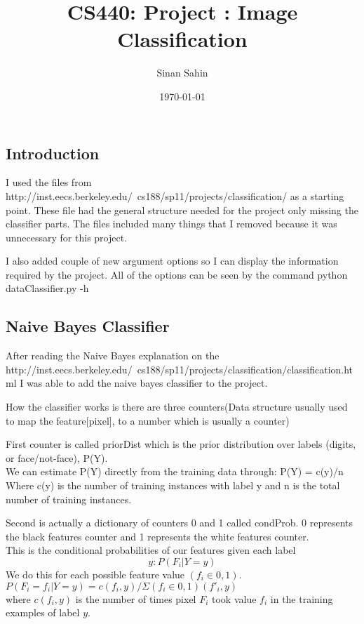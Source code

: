\documentclass[11]{article}
\begin{document}
\title{CS440: Project : Image Classification}
\author{Sinan Sahin}
\date{\today}
\maketitle
\subsection*{Introduction}
\qquad I used the files from http://inst.eecs.berkeley.edu/~cs188/sp11/projects/classification/ as a starting point. These file had the general structure needed for the project only missing the classifier parts. The files included many things that I removed because it was unnecessary for this project.

I also added couple of new argument options so I can display the information required by the project. All of the options can be seen by the command python dataClassifier.py -h
\subsection*{Naive Bayes Classifier}
\qquad After reading the Naive Bayes explanation on the http://inst.eecs.berkeley.edu/~cs188/sp11/projects/classification/classification.html I was able to add the naive bayes classifier to the project.

How the classifier works is  there are three counters(Data structure usually used to map the feature[pixel], to a number which is usually a counter)

First counter is called priorDist which is the prior distribution over labels (digits, or face/not-face), P(Y).\\
We can estimate P(Y) directly from the training data through: P(Y) = c(y)/n \\
Where c(y) is the number of training instances with label y and n is the total number of training instances.

Second is actually a dictionary of counters 0 and 1 called condProb. 0 represents the black features counter and 1 represents the white features counter.\\
This is the conditional probabilities of our features given each label $$y: P(F_i | Y = y)$$
We do this for each possible feature value $(f_i \in {0,1})$.
\\$P(F_i = f_i | Y = y) = c(f_i, y) / \Sigma(f_i \in {0,1})(f'_i, y)$
\\where $c(f_i, y)$ is the number of times pixel $F_i$ took value $f_i$ in the training examples of label $y$.
\end{document}
